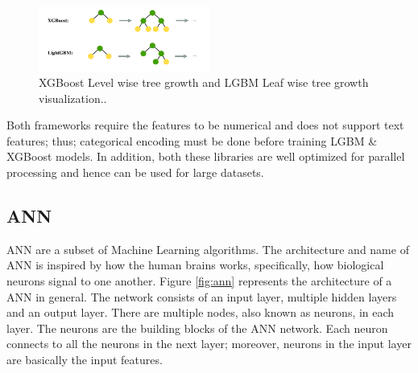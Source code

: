 \documentclass[twoside,11pt,a4paper]{article}
\begin{document}
\begin{figure}[ht]
	\centering
	\includegraphics[width=0.5\textwidth]{lgbm_xgboost_tree_growth}
	\caption[\acs{XGBoost} Level wise tree growth and \acs{LGBM} Leaf wise tree growth visualization.]{\acs{XGBoost} Level wise tree growth and \acs{LGBM} Leaf wise tree growth visualization.\cite{rezazadeh2020generalized}.}
	\label{fig:lgbm_xgboost_tree_growth}
\end{figure}
\FloatBarrier
Both frameworks require the features to be numerical and does not support text features; thus; categorical encoding must be done before training \acs{LGBM} \& \acs{XGBoost} models.
In addition, both these libraries are well optimized for parallel processing and hence can be used for large datasets.

\subsection{\acf{ANN}}
\acs{ANN} are a subset of Machine Learning algorithms. The  architecture and name of \acs{ANN} is inspired by how the human brains works, specifically, how biological neurons signal to one another\citep{ibm2022neural}. Figure \ref{fig:ann} represents the architecture of a \acs{ANN} in general. The network consists of an input layer, multiple hidden layers and an output layer. There are multiple nodes, also known as neurons, in each layer. The neurons are the building blocks of the \acs{ANN} network. Each neuron connects to all the neurons in the next layer; moreover, neurons in the input layer are basically the input features.\\
\end{document}
